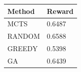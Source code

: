\begin{tabular}{ll}
\hline
Method & Reward \\
\hline
  MCTS & 0.6487 \\
  RANDOM & 0.6588 \\
  GREEDY & 0.5398 \\
  GA & 0.6439 \\
\hline
\end{tabular}
